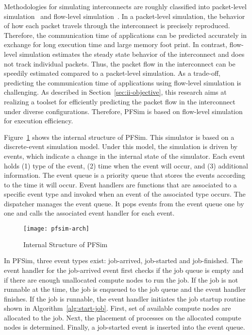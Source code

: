 Methodologies for simulating interconnects are roughly classified into
packet-level simulation~\cite{Hoefler2010} and flow-level
simulation~\cite{Schneider2009}. In a packet-level simulation, the behavior of
how each packet travels through the interconnect is precisely reproduced.
Therefore, the communication time of applications can be predicted accurately
in exchange for long execution time and large memory foot print. In contrast,
flow-level simulation estimates the steady state behavior of the interconnect
and does not track individual packets. Thus, the packet flow in the
interconnect can be speedily estimated compared to a packet-level simulation.
As a trade-off, predicting the communication time of applications using
flow-level simulation is challenging. As described in
Section~\ref{sec:ii-objective}, this research aims at realizing a toolset for
efficiently predicting the packet flow in the interconnect under diverse
configurations. Therefore, PFSim is based on flow-level simulation for
execution efficiency.

Figure~\ref{fig:pfsim-arch} shows the internal structure of PFSim. This
simulator is based on a discrete-event simulation model. Under this model, the
simulation is driven by events, which indicate a change in the internal state
of the simulator. Each event holds (1) type of the event, (2) time when the
event will occur, and (3) additional information. The event queue is a
priority queue that stores the events according to the time it will occur.
Event handlers are functions that are associated to a specific event type and
invoked when an event of the associated type occurs. The dispatcher manages
the event queue. It pops events from the event queue one by one and calls the
associated event handler for each event.

\begin{figure}
    \centering
    \texttt{[image: pfsim-arch]}
    \caption{Internal Structure of PFSim}%
    \label{fig:pfsim-arch}
\end{figure}

In PFSim, three event types exist: job-arrived, job-started and
job-finished. The event handler for the job-arrived event first checks if
the job queue is empty and if there are enough unallocated compute nodes to
run the job. If the job is not runnable at the time, the job is enqueued to
the job queue and the event handler finishes. If the job is runnable, the
event handler initiates the job startup routine shown in
Algorithm~\ref{alg:start-job}. First, set of available compute nodes are
allocated to the job. Next, the placement of processes on the allocated
compute nodes is determined. Finally, a job-started event is inserted into the
event queue.

